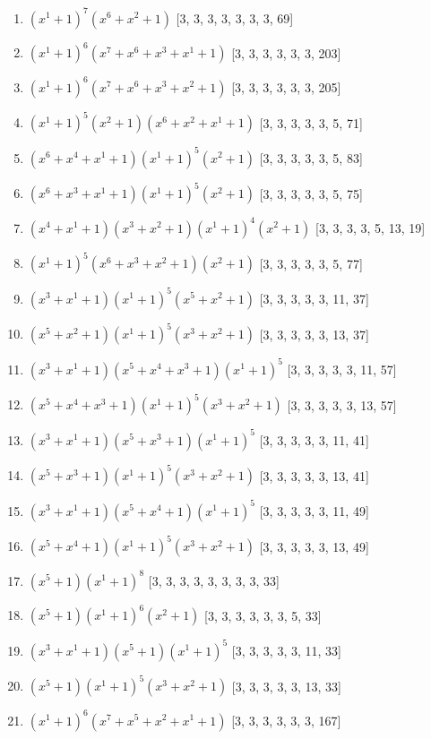 \documentclass[10pt,twocolumn]{article}
\begin{document}
\begin{enumerate}
\item $(x^{1} + 1)^{7}(x^{6} + x^{2} + 1)$  [3, 3, 3, 3, 3, 3, 3, 69]
\item $(x^{1} + 1)^{6}(x^{7} + x^{6} + x^{3} + x^{1} + 1)$  [3, 3, 3, 3, 3, 3, 203]
\item $(x^{1} + 1)^{6}(x^{7} + x^{6} + x^{3} + x^{2} + 1)$  [3, 3, 3, 3, 3, 3, 205]
\item $(x^{1} + 1)^{5}(x^{2} + 1)(x^{6} + x^{2} + x^{1} + 1)$  [3, 3, 3, 3, 3, 5, 71]
\item $(x^{6} + x^{4} + x^{1} + 1)(x^{1} + 1)^{5}(x^{2} + 1)$  [3, 3, 3, 3, 3, 5, 83]
\item $(x^{6} + x^{3} + x^{1} + 1)(x^{1} + 1)^{5}(x^{2} + 1)$  [3, 3, 3, 3, 3, 5, 75]
\item $(x^{4} + x^{1} + 1)(x^{3} + x^{2} + 1)(x^{1} + 1)^{4}(x^{2} + 1)$  [3, 3, 3, 3, 5, 13, 19]
\item $(x^{1} + 1)^{5}(x^{6} + x^{3} + x^{2} + 1)(x^{2} + 1)$  [3, 3, 3, 3, 3, 5, 77]
\item $(x^{3} + x^{1} + 1)(x^{1} + 1)^{5}(x^{5} + x^{2} + 1)$  [3, 3, 3, 3, 3, 11, 37]
\item $(x^{5} + x^{2} + 1)(x^{1} + 1)^{5}(x^{3} + x^{2} + 1)$  [3, 3, 3, 3, 3, 13, 37]
\item $(x^{3} + x^{1} + 1)(x^{5} + x^{4} + x^{3} + 1)(x^{1} + 1)^{5}$  [3, 3, 3, 3, 3, 11, 57]
\item $(x^{5} + x^{4} + x^{3} + 1)(x^{1} + 1)^{5}(x^{3} + x^{2} + 1)$  [3, 3, 3, 3, 3, 13, 57]
\item $(x^{3} + x^{1} + 1)(x^{5} + x^{3} + 1)(x^{1} + 1)^{5}$  [3, 3, 3, 3, 3, 11, 41]
\item $(x^{5} + x^{3} + 1)(x^{1} + 1)^{5}(x^{3} + x^{2} + 1)$  [3, 3, 3, 3, 3, 13, 41]
\item $(x^{3} + x^{1} + 1)(x^{5} + x^{4} + 1)(x^{1} + 1)^{5}$  [3, 3, 3, 3, 3, 11, 49]
\item $(x^{5} + x^{4} + 1)(x^{1} + 1)^{5}(x^{3} + x^{2} + 1)$  [3, 3, 3, 3, 3, 13, 49]
\item $(x^{5} + 1)(x^{1} + 1)^{8}$  [3, 3, 3, 3, 3, 3, 3, 3, 33]
\item $(x^{5} + 1)(x^{1} + 1)^{6}(x^{2} + 1)$  [3, 3, 3, 3, 3, 3, 5, 33]
\item $(x^{3} + x^{1} + 1)(x^{5} + 1)(x^{1} + 1)^{5}$  [3, 3, 3, 3, 3, 11, 33]
\item $(x^{5} + 1)(x^{1} + 1)^{5}(x^{3} + x^{2} + 1)$  [3, 3, 3, 3, 3, 13, 33]
\item $(x^{1} + 1)^{6}(x^{7} + x^{5} + x^{2} + x^{1} + 1)$  [3, 3, 3, 3, 3, 3, 167]

\end{enumerate}
\end{document}
